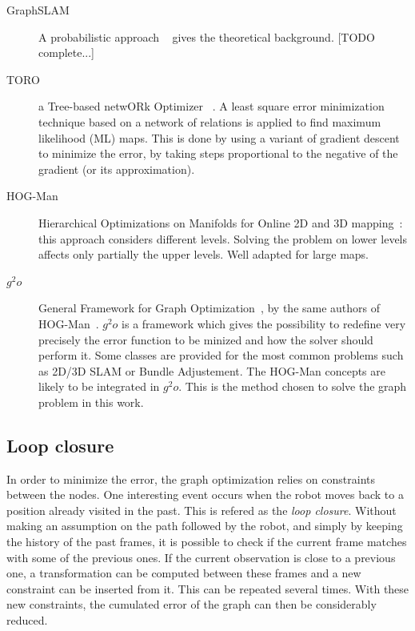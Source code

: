 \begin{description}
\item[GraphSLAM] A probabilistic approach ~\cite{Thrun_2005} gives the theoretical background. [TODO complete...]
\item[TORO] a Tree-based netwORk Optimizer ~\cite{grisetti07rss}. A least square error minimization technique based on a network of relations is applied to find maximum likelihood (ML) maps. This is done by using a variant of gradient descent to minimize the error, by taking steps proportional to the negative of the gradient (or its approximation).
\item[HOG-Man] Hierarchical Optimizations on Manifolds for Online 2D and 3D mapping~\cite{hogman_2010}: this approach considers different levels. Solving the problem on lower levels affects only partially the upper levels. Well adapted for large maps.
\item[$g^2o$] General Framework for Graph Optimization~\cite{g2o_2011}, by the same authors of HOG-Man~\cite{hogman_2010}. $g^2o$ is a framework which gives the possibility to redefine very precisely the error function to be minized and how the solver should perform it. Some classes are provided for the most common problems such as 2D/3D SLAM or Bundle Adjustement. The HOG-Man concepts are likely to be integrated in $g^2o$. This is the method chosen to solve the graph problem in this work.
\end{description}

\subsection{Loop closure}

In order to minimize the error, the graph optimization relies on constraints between the nodes. One interesting event occurs when the robot moves back to a position already visited in the past. This is refered as the \emph{loop closure}. Without making an assumption on the path followed by the robot, and simply by keeping the history of the past frames, it is possible to check if the current frame matches with some of the previous ones. If the current observation is close to a previous one, a transformation can be computed between these frames and a new constraint can be inserted from it. This can be repeated several times. With these new constraints, the cumulated error of the graph can then be considerably reduced. 

